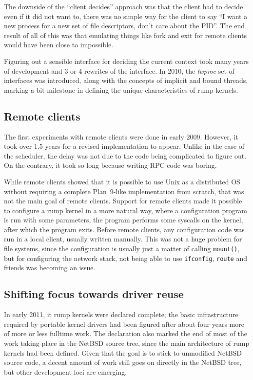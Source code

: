 The downside of the ``client decides'' approach was that the client
had to decide even if it did not want to, \ie there was no simple way
for the client to say ``I want a new process for a new set of file
descriptors, don't care about the PID''.  The end result of all of this
was that emulating things like fork and exit for remote clients would
have been close to impossible.

Figuring out a sensible interface for deciding the current context
took many years of development and 3 or 4 rewrites of the interface.
In 2010, the \textit{lwproc} set of interfaces was introduced, along with
the concepts of implicit and bound threads, marking a bit milestone in
defining the unique characteristics of rump kernels.


\subsection{Remote clients}

The first experiments with remote clients were done in early 2009.
However, it took over 1.5 years for a revised implementation to appear.
Unlike in the case of the scheduler, the delay was not due to the code
being complicated to figure out.  On the contrary, it took so long
because writing RPC code was boring.

While remote clients showed that it is possible to use Unix as a
distributed OS without requiring a complete Plan~9-like implementation
from scratch, that was not the main goal of remote clients.  Support for
remote clients made it possible to configure a rump kernel in a more
natural way, where a configuration program is run with some parameters,
the program performs some syscalls on the kernel, after which the program
exits.  Before remote clients, any configuration code was run in a local
client, usually written manually.  This was not a huge problem for
file systems, since the configuration is usually just a matter of
calling \verb+mount()+, but for configuring the network stack, not being
able to use \texttt{ifconfig}, \texttt{route} and friends was becoming
an issue.


\subsection{Shifting focus towards driver reuse}

In early 2011, it rump kernels were declared complete; the basic
infrastructure required by portable kernel drivers had been figured after
about four years more of more or less fulltime work.  The declaration
also marked the end of most of the work taking place in the NetBSD source
tree, since the main architecture of rump kernels had been defined.
Given that the goal is to stick to unmodified NetBSD source code,
a decent amount of work still goes on directly in the NetBSD tree,
but other development loci are emerging.

